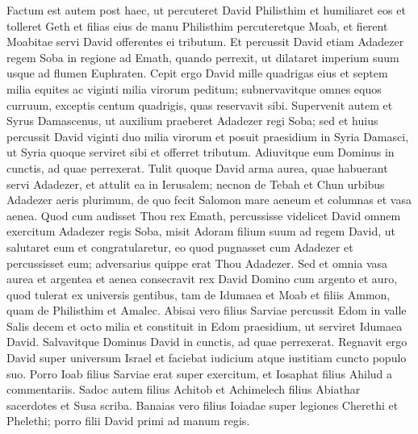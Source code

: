 \begin{biblechapter}
\begin{biblechapter}
\begin{biblechapter}
\begin{biblechapter}
\begin{biblechapter}
\begin{biblechapter}
\begin{biblechapter}
\begin{biblechapter}
\begin{biblechapter}
\begin{biblechapter}
\begin{biblechapter}
\begin{biblechapter}
\begin{biblechapter}
\begin{biblechapter}
\begin{biblechapter}
\begin{biblechapter}
\begin{biblechapter}
\begin{biblechapter}
\verse Factum est autem post haec, ut percuteret David Philisthim et humiliaret eos et tolleret Geth et filias eius de manu Philisthim 
\verse percuteretque Moab, et fierent Moabitae servi David offerentes ei tributum.
 \verse Et percussit David etiam Adadezer regem Soba in regione ad Emath, quando perrexit, ut dilataret imperium suum usque ad flumen Euphraten. 
\verse Cepit ergo David mille quadrigas eius et septem milia equites ac viginti milia virorum peditum; subnervavitque omnes equos curruum, exceptis centum quadrigis, quas reservavit sibi. 
\verse Supervenit autem et Syrus Damascenus, ut auxilium praeberet Adadezer regi Soba; sed et huius percussit David viginti duo milia virorum 
\verse et posuit praesidium in Syria Damasci, ut Syria quoque serviret sibi et offerret tributum. Adiuvitque eum Dominus in cunctis, ad quae perrexerat. 
\verse Tulit quoque David arma aurea, quae habuerant servi Adadezer, et attulit ea in Ierusalem; 
\verse necnon de Tebah et Chun urbibus Adadezer aeris plurimum, de quo fecit Salomon mare aeneum et columnas et vasa aenea.
 \verse Quod cum audisset Thou rex Emath, percussisse videlicet David omnem exercitum Adadezer regis Soba, 
\verse misit Adoram filium suum ad regem David, ut salutaret eum et congratularetur, eo quod pugnasset cum Adadezer et percussisset eum; adversarius quippe erat Thou Adadezer. 
\verse Sed et omnia vasa aurea et argentea et aenea consecravit rex David Domino cum argento et auro, quod tulerat ex universis gentibus, tam de Idumaea et Moab et filiis Ammon, quam de Philisthim et Amalec.
 \verse Abisai vero filius Sarviae percussit Edom in valle Salis decem et octo milia 
\verse et constituit in Edom praesidium, ut serviret Idumaea David. Salvavitque Dominus David in cunctis, ad quae perrexerat.
 \verse Regnavit ergo David super universum Israel et faciebat iudicium atque iustitiam cuncto populo suo. 
\verse Porro Ioab filius Sarviae erat super exercitum, et Iosaphat filius Ahilud a commentariis. 
\verse Sadoc autem filius Achitob et Achimelech filius Abiathar sacerdotes et Susa scriba. 
\verse Banaias vero filius Ioiadae super legiones Cherethi et Phelethi; porro filii David primi ad manum regis.
 

\end{biblechapter}
\end{biblechapter}
\end{biblechapter}
\end{biblechapter}
\end{biblechapter}
\end{biblechapter}
\end{biblechapter}
\end{biblechapter}
\end{biblechapter}
\end{biblechapter}
\end{biblechapter}
\end{biblechapter}
\end{biblechapter}
\end{biblechapter}
\end{biblechapter}
\end{biblechapter}
\end{biblechapter}
\end{biblechapter}
